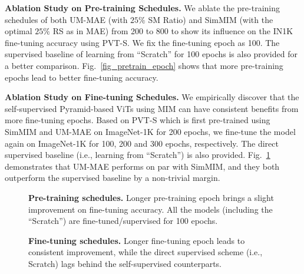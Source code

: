 \documentclass{article}
\begin{document}
\textbf{Ablation Study on Pre-training Schedules.} We ablate the pre-training schedules of both UM-MAE (with $25\%$ SM Ratio) and SimMIM (with the optimal $25\%$ RS as in MAE) from 200 to 800 to show its influence on the IN1K fine-tuning accuracy using PVT-S. We fix the fine-tuning epoch as 100. The supervised baseline of learning from ``Scratch'' for 100 epochs is also provided for a better comparison. Fig.~\ref{fig_pretrain_epoch} shows that more pre-training epochs lead to better fine-tuning accuracy.


\textbf{Ablation Study on Fine-tuning Schedules.} We empirically discover that the self-supervised Pyramid-based ViTs using MIM can have consistent benefits from more fine-tuning epochs. Based on PVT-S which is first pre-trained using SimMIM and UM-MAE on ImageNet-1K for 200 epochs, we fine-tune the model again on ImageNet-1K for 100, 200 and 300 epochs, respectively. The direct supervised baseline (i.e., learning from ``Scratch'') is also provided. Fig.~\ref{fig_finetune_epoch} demonstrates that UM-MAE performs on par with SimMIM, and they both outperform the supervised baseline by a non-trivial margin.


\begin{figure}[t]
    \vspace{0pt}
    \centering
    \begin{minipage}[ht]{0.48\textwidth}
    \vspace{0pt}
	\begin{center}
		\setlength{\fboxrule}{0pt}
	\end{center}	
	\vspace{-16pt}
	\caption{\textbf{Pre-training schedules.} Longer pre-training epoch brings a slight improvement on fine-tuning accuracy. All the models (including the ``Scratch'') are fine-tuned/supervised for 100 epochs. 
	}
	\label{fig_pretrain_epoch}
	\vspace{-6pt}
\end{minipage}
\hspace{4pt}
\begin{minipage}[ht]{0.48\textwidth}
    \vspace{0pt}
	\begin{center}
		\setlength{\fboxrule}{0pt}
	\end{center}	
	\vspace{-16pt}
	\caption{\textbf{Fine-tuning schedules.} Longer fine-tuning epoch leads to consistent improvement, while the direct supervised scheme (i.e., Scratch) lags behind the self-supervised counterparts.
	}
	\label{fig_finetune_epoch}
	\vspace{-6pt}
\end{minipage}     \vspace{0pt}
\end{figure}
\end{document}
